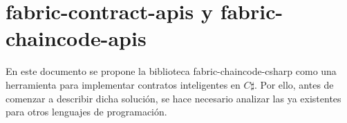 %
%
%
%





%
%



\section{fabric-contract-apis y fabric-chaincode-apis}
En este documento se propone la biblioteca fabric-chaincode-csharp como una herramienta para implementar contratos inteligentes en $ C\sharp $. Por ello, antes de comenzar a describir dicha solución, se hace necesario analizar las ya existentes para otros lenguajes de programación.

